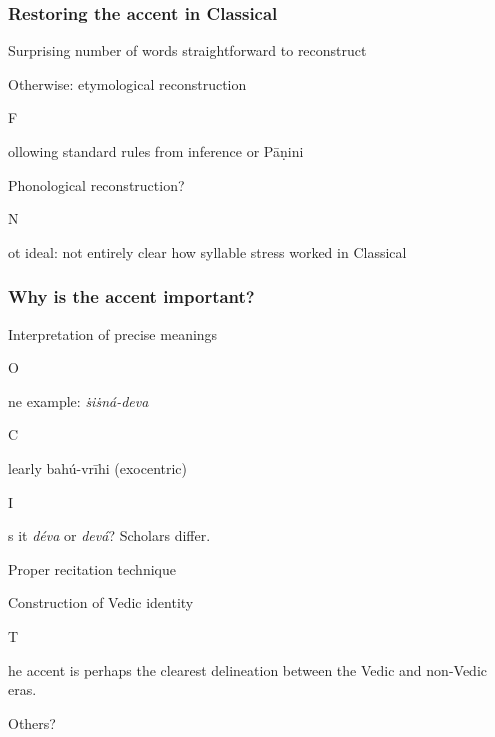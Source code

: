 \documentclass[pdf]{beamer}
\newcommand{\Subitem}[1]{{\setlength\itemindent{12pt} \item[-] #1}}
\begin{document}
\begin{frame} \frametitle{Restoring the accent in Classical}
\begin{itemize}
	\item Surprising number of words straightforward to reconstruct
	\item Otherwise: etymological reconstruction
	\Subitem Following standard rules from inference or Pāṇini
	\item Phonological reconstruction?
	\Subitem Not ideal: not entirely clear how syllable stress worked in Classical
\end{itemize}
\end{frame}

\begin{frame} \frametitle{Why is the accent important?}
\begin{itemize}
	\item Interpretation of precise meanings
	\Subitem One example: \textit{ṡiṡná-deva}
	\Subitem Clearly bahú-vrīhi (exocentric)
	\Subitem Is it \textit{déva} or \textit{devá}? Scholars differ.
	\item Proper recitation technique
	\item Construction of Vedic identity
	\Subitem The accent is perhaps the clearest delineation between the Vedic and non-Vedic eras.
	\item Others?
\end{itemize}
\end{frame}

\end{document}
